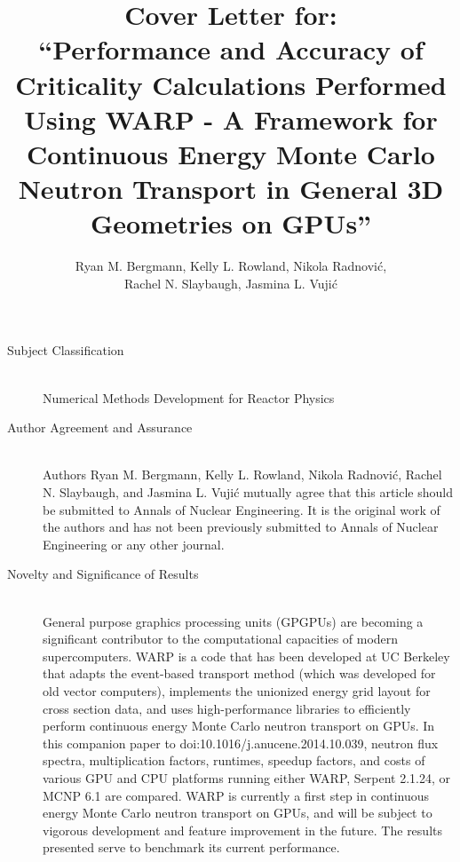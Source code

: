\documentclass{article}
\begin{document}

\title{Cover Letter for: \\ ``Performance and Accuracy of Criticality Calculations Performed Using WARP - A Framework for Continuous Energy Monte Carlo Neutron Transport in General 3D Geometries on GPUs''}
\author{Ryan M. Bergmann, Kelly L. Rowland, Nikola Radnovi\'c, \\ Rachel N. Slaybaugh, Jasmina L. Vuji\'c}
\maketitle

\begin{description}
\item[Subject Classification] \hfill
\\
Numerical Methods Development for Reactor Physics

\item[Author Agreement and Assurance] \hfill
\\
Authors Ryan M. Bergmann, Kelly L. Rowland, Nikola Radnovi\'c, Rachel N. Slaybaugh, and Jasmina L. Vuji\'c mutually agree that this article should be submitted to Annals of Nuclear Engineering.  It is the original work of the authors and has not been previously submitted to Annals of Nuclear Engineering or any other journal.

\item[Novelty and Significance of Results] \hfill
\\
General purpose graphics processing units (GPGPUs) are becoming a significant contributor to the computational capacities of modern supercomputers.  WARP is a code that has been developed at UC Berkeley that adapts the event-based transport method (which was developed for old vector computers), implements the unionized energy grid layout for cross section data, and uses high-performance libraries to efficiently perform continuous energy Monte Carlo neutron transport on GPUs.   In this companion paper to doi:10.1016/j.anucene.2014.10.039, neutron flux spectra, multiplication factors, runtimes, speedup factors, and costs of various GPU and CPU platforms running either WARP, Serpent 2.1.24, or MCNP 6.1 are compared.  WARP is currently a first step in continuous energy Monte Carlo neutron transport on GPUs, and will be subject to vigorous development and feature improvement in the future.  The results presented serve to benchmark its current performance.

\end{description}
\end{document}
